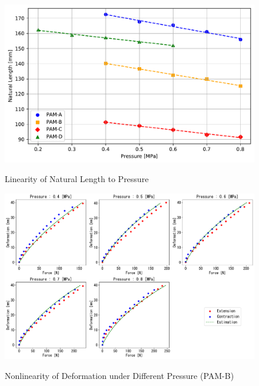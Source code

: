 \begin{figure}[t]
    \hfill
    \begin{minipage}{\columnwidth}
        \centering
        \includegraphics[width=\columnwidth]{fig/length_pressure.pdf} 
        \caption{Linearity of Natural Length to Pressure}
        \label{fig:length_pressure}
        \vspace{1em} 
        \includegraphics[width=\columnwidth]{fig/20231124_5_4s_2d_ieeesensors1.pdf}
        \caption{Nonlinearity of Deformation under Different Pressure (PAM-B)}
        \label{fig:pam_b_static1}
    \end{minipage}
    \hspace{0.05\textwidth} 
\end{figure}






